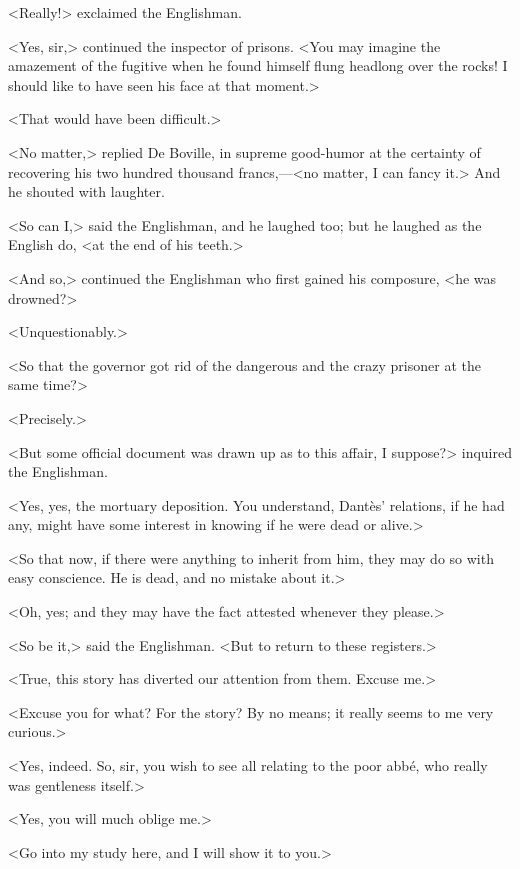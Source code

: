  <Really!> exclaimed the Englishman. 

 <Yes, sir,> continued the inspector of prisons. <You may imagine the amazement of the fugitive when he found himself flung headlong over the rocks! I should like to have seen his face at that moment.> 

 <That would have been difficult.> 

 <No matter,> replied De Boville, in supreme good-humor at the certainty of recovering his two hundred thousand francs,—<no matter, I can fancy it.> And he shouted with laughter. 

 <So can I,> said the Englishman, and he laughed too; but he laughed as the English do, <at the end of his teeth.> 

 <And so,> continued the Englishman who first gained his composure, <he was drowned?> 

 <Unquestionably.> 

 <So that the governor got rid of the dangerous and the crazy prisoner at the same time?> 

 <Precisely.>

<But some official document was drawn up as to this affair, I suppose?> inquired the Englishman. 

 <Yes, yes, the mortuary deposition. You understand, Dantès' relations, if he had any, might have some interest in knowing if he were dead or alive.> 

 <So that now, if there were anything to inherit from him, they may do so with easy conscience. He is dead, and no mistake about it.> 

 <Oh, yes; and they may have the fact attested whenever they please.> 

 <So be it,> said the Englishman. <But to return to these registers.> 

 <True, this story has diverted our attention from them. Excuse me.> 

 <Excuse you for what? For the story? By no means; it really seems to me very curious.> 

 <Yes, indeed. So, sir, you wish to see all relating to the poor abbé, who really was gentleness itself.> 

 <Yes, you will much oblige me.> 

 <Go into my study here, and I will show it to you.> 

